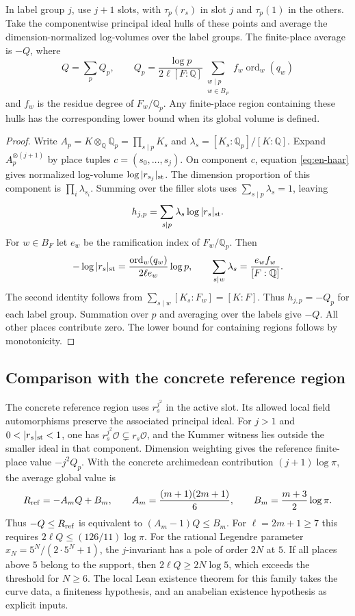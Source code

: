 \documentclass[UTF8,fontset=none,zihao=-4,a4paper]{ctexart}
\newcommand{\OO}{\mathcal O}
\newcommand{\Q}{\mathbb Q}
\newcommand{\ord}{\operatorname{ord}}
\begin{document}
\begin{trivlist}\item[\hskip\labelsep\textbf{Proposition 1.}]
In label group \(j\), use \(j+1\) slots, with \(\tau_p(r_s)\) in slot \(j\) and \(\tau_p(1)\) in the others. Take the componentwise principal ideal hulls of these points and average the dimension-normalized log-volumes over the label groups. The finite-place average is \(-Q\), where
\[
 Q=\sum_p Q_p,\qquad
 Q_p=\frac{\log p}{2\ell[F:\Q]}
       \sum_{\substack{w\mid p\\w\in B_F}} f_w\ord_w(q_w)
\]
and \(f_w\) is the residue degree of \(F_w/\Q_p\). Any finite-place region containing these hulls has the corresponding lower bound when its global volume is defined.
\end{trivlist}
\begin{proof}
Write \(A_p=K\otimes_{\Q}\Q_p=\prod_{s\mid p}K_s\) and \(\lambda_s=[K_s:\Q_p]/[K:\Q]\). Expand \(A_p^{\otimes(j+1)}\) by place tuples \(c=(s_0,\ldots,s_j)\). On component \(c\), equation \eqref{eq:en-haar} gives normalized log-volume \(\log|r_{s_j}|_{\rm st}\). The dimension proportion of this component is \(\prod_i\lambda_{s_i}\). Summing over the filler slots uses \(\sum_{s\mid p}\lambda_s=1\), leaving
\[
 h_{j,p}=\sum_{s\mid p}\lambda_s\log|r_s|_{\rm st}.
\]
For \(w\in B_F\) let \(e_w\) be the ramification index of \(F_w/\Q_p\). Then
\[
 -\log|r_s|_{\rm st}=\frac{\ord_w(q_w)}{2\ell e_w}\log p,\qquad
 \sum_{s\mid w}\lambda_s=\frac{e_w f_w}{[F:\Q]}.
\]
The second identity follows from \(\sum_{s\mid w}[K_s:F_w]=[K:F]\). Thus \(h_{j,p}=-Q_p\) for each label group. Summation over \(p\) and averaging over the labels give \(-Q\). All other places contribute zero. The lower bound for containing regions follows by monotonicity.
\end{proof}

\subsection{Comparison with the concrete reference region}
The concrete reference region uses \(r_s^{j^2}\) in the active slot. Its allowed local field automorphisms preserve the associated principal ideal. For \(j>1\) and \(0<|r_s|_{\rm st}<1\), one has \(r_s^{j^2}\OO\subsetneq r_s\OO\), and the Kummer witness lies outside the smaller ideal in that component. Dimension weighting gives the reference finite-place value \(-j^2Q_p\). With the concrete archimedean contribution \((j+1)\log\pi\), the average global value is
\[
 R_{\rm ref}=-A_m Q+B_m,\qquad
 A_m=\frac{(m+1)(2m+1)}6,\qquad B_m=\frac{m+3}2\log\pi .
\]
Thus \(-Q\le R_{\rm ref}\) is equivalent to \((A_m-1)Q\le B_m\). For \(\ell=2m+1\ge7\) this requires \(2\ell Q\le(126/11)\log\pi\). For the rational Legendre parameter \(x_N=5^N/(2\cdot5^N+1)\), the \(j\)-invariant has a pole of order \(2N\) at \(5\). If all places above \(5\) belong to the support, then \(2\ell Q\ge2N\log5\), which exceeds the threshold for \(N\ge6\). The local Lean existence theorem for this family takes the curve data, a finiteness hypothesis, and an anabelian existence hypothesis as explicit inputs.\cite{localref,adapt}
\end{document}

